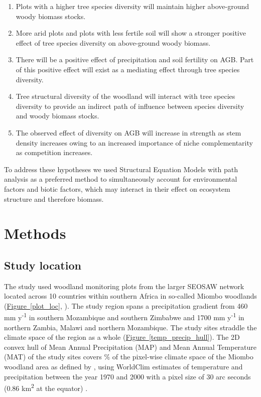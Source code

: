 \documentclass[11pt,a4paper]{article}
\begin{document}
\begin{enumerate}
	\item{Plots with a higher tree species diversity will maintain higher above-ground woody biomass stocks.}
	\item{More arid plots and plots with less fertile soil will show a stronger positive effect of tree species diversity on above-ground woody biomass.} 
	\item{There will be a positive effect of precipitation and soil fertility on AGB. Part of this positive effect will exist as a mediating effect through tree species diversity.}
	\item{Tree structural diversity of the woodland will interact with tree species diversity to provide an indirect path of influence between species diversity and woody biomass stocks.}
	\item{The observed effect of diversity on AGB will increase in strength as stem density increases owing to an increased importance of niche complementarity as competition increases.}
\end{enumerate}

To address these hypotheses we used Structural Equation Models with path analysis as a preferred method to simultaneously account for environmental factors and biotic factors, which may interact in their effect on ecosystem structure and therefore biomass.

\section{Methods}

\subsection{Study location}

The study used \nplots{} woodland monitoring plots from the larger SEOSAW network \citep{SEOSAW} located across 10 countries within southern Africa in so-called Miombo woodlands (\hyperref[plot_loc]{Figure~\ref*{plot_loc}}, \citealt{White1987}). The study region spans a precipitation gradient from \textapprox{}460 mm y\textsuperscript{-1} in southern Mozambique and southern Zimbabwe and \textapprox{}1700 mm y\textsuperscript{-1} in northern Zambia, Malawi and northern Mozambique. The study sites straddle the climate space of the region as a whole (\hyperref[temp_precip_hull]{Figure~\ref*{temp_precip_hull}}). The 2D convex hull of Mean Annual Precipitation (MAP) and Mean Annual Temperature (MAT) of the study sites covers \hullcover{}\% of the pixel-wise climate space of the Miombo woodland area as defined by \citet{White1987}, using WorldClim estimates of temperature and precipitation between the year 1970 and 2000 with a pixel size of 30 arc seconds (0.86 km\textsuperscript{2} at the equator) \citep{Fick2017}. 
\end{document}
